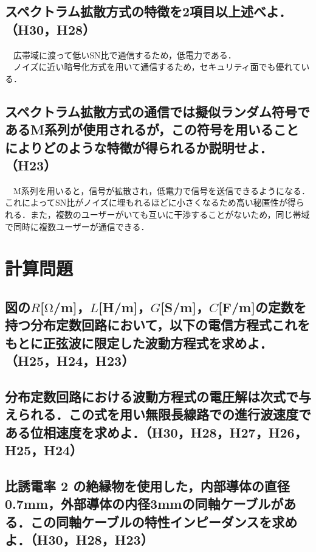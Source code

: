\subsection{スペクトラム拡散方式の特徴を2項目以上述べよ．（H30，H28）}
　広帯域に渡って低いSN比で通信するため，低電力である．\\
　ノイズに近い暗号化方式を用いて通信するため，セキュリティ面でも優れている．\\

\subsection{スペクトラム拡散方式の通信では擬似ランダム符号であるM系列が使用されるが，この符号を用いることによりどのような特徴が得られるか説明せよ．（H23）}
　M系列を用いると，信号が拡散され，低電力で信号を送信できるようになる．これによってSN比がノイズに埋もれるほどに小さくなるため高い秘匿性が得られる．また，複数のユーザーがいても互いに干渉することがないため，同じ帯域で同時に複数ユーザーが通信できる． \\

\newpage
\section{計算問題}
\subsection{図の$R$[$\mathrm{\Omega}$/m]，$L$[H/m]，$G$[S/m]，$C$[F/m]の定数を持つ分布定数回路において，以下の電信方程式これをもとに正弦波に限定した波動方程式を求めよ．（H25，H24，H23）}
\vspace{7cm}

\subsection{分布定数回路における波動方程式の電圧解は次式で与えられる．この式を用い無限長線路での進行波速度である位相速度を求めよ．（H30，H28，H27，H26，H25，H24）}
\vspace{7cm}

\subsection{比誘電率 2 の絶縁物を使用した，内部導体の直径0.7mm，外部導体の内径3mmの同軸ケーブルがある．この同軸ケーブルの特性インピーダンスを求めよ．（H30，H28，H23）}
\vspace{7cm}

